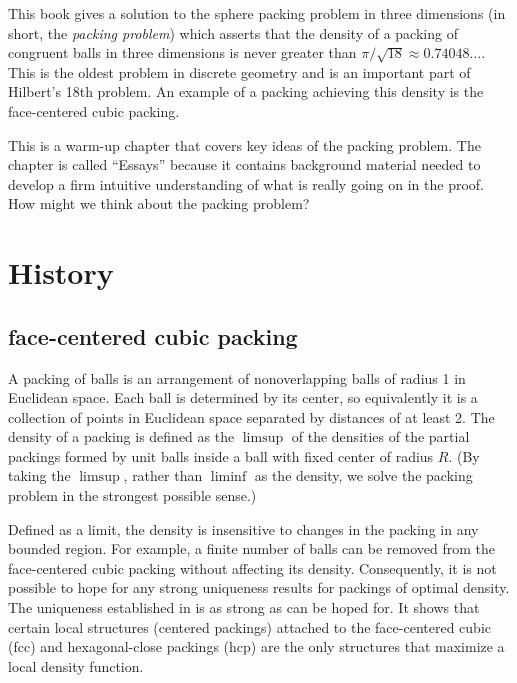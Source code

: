 









This book gives a solution to the sphere packing
problem in three dimensions  (in short, the {\it packing problem})
which asserts that the density of a packing of
congruent balls in three dimensions is never greater than
$\pi/\sqrt{18}\approx 0.74048\ldots$. This is the oldest problem
in discrete geometry and is an important part of Hilbert's 18th
problem. An example of a packing achieving this density is the
face-centered cubic packing.

This is a warm-up chapter that covers key ideas of the packing problem.
The chapter is called ``Essays'' because it contains background material
needed to develop a firm intuitive understanding of what is really going on in the proof.   How might we think about the packing problem?  


\section{History}
\label{sec:intro-review}

\subsection{face-centered cubic packing}

A packing of balls is an arrangement of
nonoverlapping balls of radius 1 in Euclidean space.
Each ball is determined by its center, so equivalently it is a collection
of points in Euclidean space separated by distances of at least 2.
The density of a packing is defined as the $\limsup$ of
the densities of the partial packings formed by unit balls inside
a ball with fixed center of radius $R$.
(By taking the $\limsup$,
rather than $\liminf$ as the density, we solve the packing problem
in the strongest possible sense.)

Defined as a limit, the density
is insensitive to changes in the packing in any bounded region.
For example, a finite number of balls can be removed from the
face-centered cubic packing without affecting its density.
Consequently, it is not possible to hope for any strong uniqueness
results for packings of optimal density.  The uniqueness
established in \cite{DCG} is as strong as can be hoped for. It
shows that certain local structures (centered packings) attached
to the face-centered cubic (fcc) and hexagonal-close packings
(hcp) are the only structures that maximize a local density
function.

